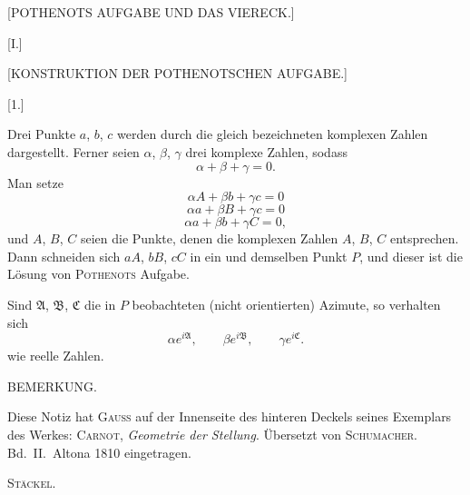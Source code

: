 \clearpage{}

\begin{center}
[POTHENOTS AUFGABE UND DAS VIERECK.]
\end{center}

\begin{center}
[I.]

[KONSTRUKTION DER POTHENOTSCHEN AUFGABE.]

[1.]
\end{center}

Drei Punkte $a$, $b$, $c$ werden durch die gleich bezeichneten
komplexen Zahlen dargestellt. Ferner seien $\alpha$, $\beta$, $\gamma$ drei komplexe
Zahlen, sodass
\[
\alpha+\beta+\gamma=0.
\]
Man setze
\[
\alpha A+\beta b+\gamma c=0
\]
\[
\alpha a+\beta B+\gamma c=0
\]
\[
\alpha a+\beta b+\gamma C=0,
\]
und $A$, $B$, $C$ seien die Punkte, denen die komplexen Zahlen
$A$, $B$, $C$ entsprechen. Dann schneiden sich $aA$,
$bB$, $cC$ in ein und demselben Punkt $P$, und dieser ist die Lösung
von \textsc{Pothenots} Aufgabe.

Sind $\mathfrak{A}$, $\mathfrak{B}$, $\mathfrak{C}$ die in $P$ beobachteten
(nicht orientierten) Azimute, so verhalten sich
\[
\alpha e^{i\mathfrak{A}}, \qquad \beta e^{i\mathfrak{B}}, \qquad \gamma e^{i\mathfrak{C}}.
\]
wie reelle Zahlen.

\begin{center}
BEMERKUNG.
\end{center}

Diese Notiz hat \textsc{Gauss} auf der Innenseite des hinteren Deckels
seines Exemplars des Werkes: \textsc{Carnot}, \emph{Geometrie der
Stellung}. Übersetzt von \textsc{Schumacher}. Bd.\ II.\ Altona 1810
eingetragen.

\par\hfill\textsc{Stäckel}.\par
